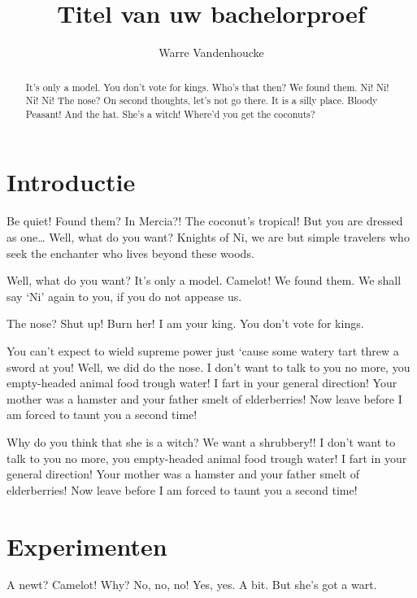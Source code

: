 \documentclass[a0,portrait]{hogent-poster}
\title{Titel van uw bachelorproef}
\author{Warre Vandenhoucke}
\begin{document}
\maketitle

\begin{abstract}
It's only a model.
You don't vote for kings. Who's that then? We found them. Ni! Ni! Ni! Ni!
The nose? On second thoughts, let's not go there. It is a silly place. Bloody Peasant! And the hat. She's a witch! Where'd you get the coconuts?
\end{abstract}

\begin{multicols}{2} %

\section{Introductie}

Be quiet! Found them? In Mercia?! The coconut's tropical! But you are dressed as one… Well, what do you want? Knights of Ni, we are but simple travelers who seek the enchanter who lives beyond these woods.

Well, what do you want? It's only a model. Camelot! We found them. We shall say `Ni' again to you, if you do not appease us.

The nose? Shut up! Burn her! I am your king. You don't vote for kings.

You can't expect to wield supreme power just `cause some watery tart threw a sword at you! Well, we did do the nose. I don't want to talk to you no more, you empty-headed animal food trough water! I fart in your general direction! Your mother was a hamster and your father smelt of elderberries! Now leave before I am forced to taunt you a second time!

Why do you think that she is a witch? We want a shrubbery!! I don't want to talk to you no more, you empty-headed animal food trough water! I fart in your general direction! Your mother was a hamster and your father smelt of elderberries! Now leave before I am forced to taunt you a second time!

\section{Experimenten}

A newt? Camelot! Why? No, no, no! Yes, yes. A bit. But she's got a wart.


\end{multicols}
\end{document}
